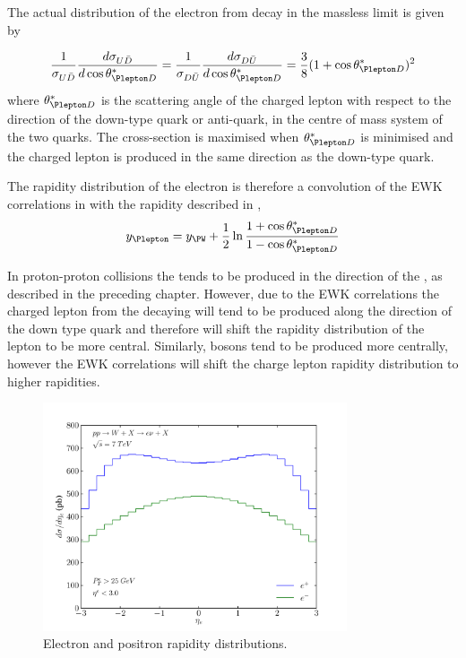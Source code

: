 The actual distribution of the electron from \PWpm decay in the massless limit
is given by\cite{} 

\begin{equation}
  \frac{1}{\sigma_{U\bar{D}}}
  \frac{d \sigma_{U\bar{D}}}{d \cos \theta_{\Plepton D}^{\ast}}
  =
  \frac{1}{\sigma_{D\bar{U}}}
  \frac{d \sigma_{D\bar{U}}}{d \cos \theta_{\Plepton D}^{\ast}}
  =
  \frac{3}{8}(1+\cos \theta_{\Plepton D}^{\ast})^2
  \label{wbos:lepton}
\end{equation}
where $\theta_{\Plepton D}^{\ast}$ is the scattering angle of the charged
lepton with respect to the direction of the down-type quark or anti-quark, in
the centre of mass system of the two quarks. The cross-section is maximised when
$\theta_{\Plepton D}^{\ast}$ is minimised and the charged lepton is produced in
the same direction as the down-type quark.

The rapidity distribution of the electron is therefore a convolution of the
\ac{EWK} correlations in  with the \PW rapidity
described in ,
\begin{equation}
  y_{\Plepton} = 
  y_{\PW} +
  \frac{1}{2}
  \ln
  \frac{1 + \cos \theta_{\Plepton D}^{\ast}}{1 - \cos \theta_{\Plepton D}^{\ast}}
  \label{wbos:leptonfull}
\end{equation}

In proton-proton collisions the \PWp tends to be produced in the direction
of the \Pup, as described in the preceding chapter.  
However, due to the EWK correlations the charged lepton from the decaying \PWp
will tend to be produced along the direction of the down type quark and
therefore will shift the rapidity distribution of the lepton to be more
central. Similarly, \PWm bosons tend to be produced more centrally, however the
EWK correlations will shift the charge lepton rapidity distribution to higher
rapidities.

\begin{figure}[htbp]
  \centering
  \includegraphics[width=0.8\textwidth]{lepton-rapidity}
  \caption{Electron and positron rapidity distributions.}
  \label{wbos:leptonrapidity}
\end{figure}

